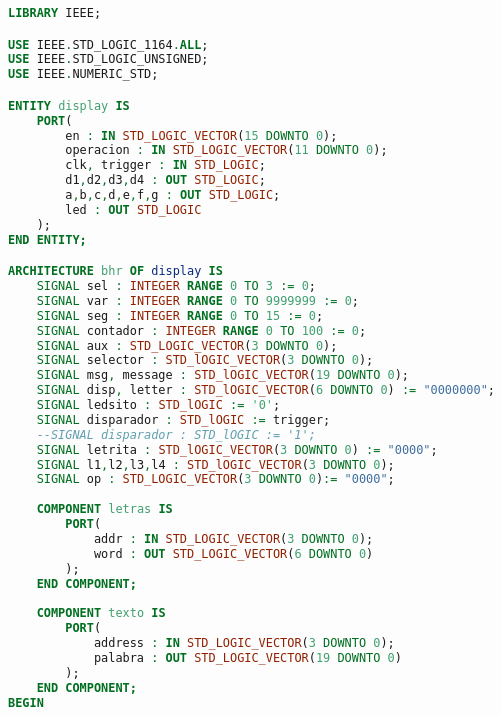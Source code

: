 \begin{lstlisting}[language={vhdl}, caption={Display}, label={Script}]
LIBRARY IEEE;

USE IEEE.STD_LOGIC_1164.ALL;
USE IEEE.STD_LOGIC_UNSIGNED;
USE IEEE.NUMERIC_STD;

ENTITY display IS 
	PORT(
		en : IN STD_LOGIC_VECTOR(15 DOWNTO 0);
		operacion : IN STD_LOGIC_VECTOR(11 DOWNTO 0);
		clk, trigger : IN STD_LOGIC;
		d1,d2,d3,d4 : OUT STD_LOGIC;
		a,b,c,d,e,f,g : OUT STD_LOGIC;
		led : OUT STD_LOGIC
	);
END ENTITY;

ARCHITECTURE bhr OF display IS
	SIGNAL sel : INTEGER RANGE 0 TO 3 := 0;
	SIGNAL var : INTEGER RANGE 0 TO 9999999 := 0;
	SIGNAL seg : INTEGER RANGE 0 TO 15 := 0;
	SIGNAL contador : INTEGER RANGE 0 TO 100 := 0;
	SIGNAL aux : STD_LOGIC_VECTOR(3 DOWNTO 0);
	SIGNAL selector : STD_lOGIC_VECTOR(3 DOWNTO 0);
	SIGNAL msg, message : STD_lOGIC_VECTOR(19 DOWNTO 0);
	SIGNAL disp, letter : STD_lOGIC_VECTOR(6 DOWNTO 0) := "0000000";
	SIGNAL ledsito : STD_lOGIC := '0';
	SIGNAL disparador : STD_lOGIC := trigger;
	--SIGNAL disparador : STD_lOGIC := '1';
	SIGNAL letrita : STD_lOGIC_VECTOR(3 DOWNTO 0) := "0000";
	SIGNAL l1,l2,l3,l4 : STD_lOGIC_VECTOR(3 DOWNTO 0);
	SIGNAL op : STD_LOGIC_VECTOR(3 DOWNTO 0):= "0000";
	
	COMPONENT letras IS
		PORT(
			addr : IN STD_LOGIC_VECTOR(3 DOWNTO 0);
			word : OUT STD_LOGIC_VECTOR(6 DOWNTO 0)
		);
	END COMPONENT;
	
	COMPONENT texto IS
		PORT(
			address : IN STD_LOGIC_VECTOR(3 DOWNTO 0);
			palabra : OUT STD_LOGIC_VECTOR(19 DOWNTO 0)
		);
	END COMPONENT;
BEGIN
	

\end{lstlisting}
